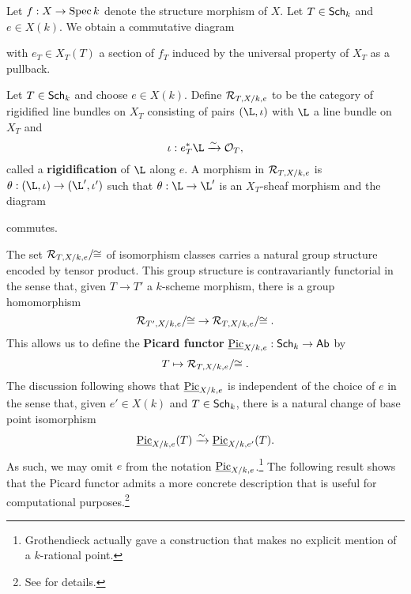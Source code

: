 \documentclass[11pt]{article}
\begin{document}
Let $f: X\to\operatorname{Spec} k$ denote the structure morphism of $X$. Let $T\in\operatorname{\mathsf{Sch}}_k$ and $e\in X(k)$. We obtain a commutative diagram
\begin{center}
\end{center}
with $e_T\in X_T(T)$ a section of $f_T$ induced by the universal property of $X_T$ as a pullback.

\begin{definition}
Let $T\in\operatorname{\mathsf{Sch}}_k$ and choose $e\in X(k)$. Define $\mathcal{R}_{T,X/k,e}$ to be the category of rigidified line bundles on $X_T$ consisting of pairs $(\L,\iota)$ with $\L$ a line bundle on $X_T$ and 
$$\iota: e_T^*\L\xto{\sim}\O_T,$$ 
called a \textbf{rigidification} of $\L$ along $e$. A morphism in $\mathcal{R}_{T,X/k,e}$ is $\theta: (\L,\iota)\to(\L',\iota')$ such that $\theta: \L\to\L'$ is an $X_T$-sheaf morphism and the diagram
\begin{center}
\end{center}
commutes.
\end{definition}

The set $\mathcal{R}_{T,X/k,e}/\!\!\cong$ of isomorphism classes carries a natural group structure encoded by tensor product. This group structure is contravariantly functorial in the sense that, given $T\to T'$ a $k$-scheme morphism, there is a group homomorphism 
$$\mathcal{R}_{T',X/k,e}/\!\!\cong\;\to\mathcal{R}_{T,X/k,e}/\!\!\cong.$$
This allows us to define the \textbf{Picard functor} $\underline{\operatorname{Pic}}_{X/k,e}: \operatorname{\mathsf{Sch}}_k\to\operatorname{\mathsf{Ab}}$ by 
$$T\mapsto\mathcal{R}_{T,X/k,e}/\!\!\cong.$$
The discussion following \cite[\textrm{Def 2.2.11}]{Conrad} shows that $\underline{\operatorname{Pic}}_{X/k,e}$ is independent of the choice of $e$ in the sense that, given $e'\in X(k)$ and $T\in\operatorname{\mathsf{Sch}}_k$, there is a natural change of base point isomorphism
$$\underline{\operatorname{Pic}}_{X/k,e}(T)\xrightarrow{\sim}\underline{\operatorname{Pic}}_{X/k,e'}(T).$$
As such, we may omit $e$ from the notation $\underline{\operatorname{Pic}}_{X/k,e}$.\footnote{Grothendieck actually gave a construction that makes no explicit mention of a $k$-rational point.} The following result shows that the Picard functor admits a more concrete description that is useful for computational purposes.\footnote{See \cite[\textrm{Prop 2.2.12}]{Conrad} for details.}
\end{document}
